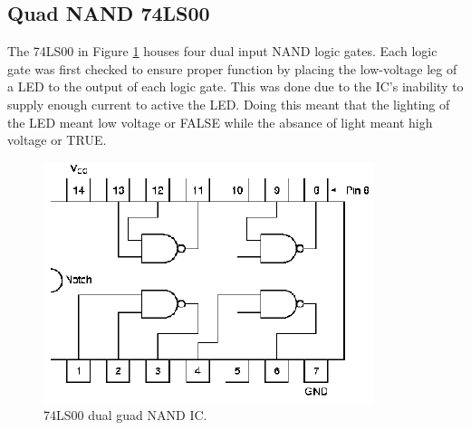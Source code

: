 \documentclass[11pt,onecolumn,letter]{article}
\begin{document}
\subsection{Quad NAND 74LS00}\label{subsec:QuadNAND}
The 74LS00 in Figure \ref{fig:74LS00} houses four dual input NAND logic gates. Each logic gate was first checked to ensure proper function by placing the low-voltage leg of a LED to the output of each logic gate. This was done due to the IC's inability to supply enough current to active the LED. Doing this meant that the lighting of the LED meant low voltage or FALSE while the absance of light meant high voltage or TRUE.
%
%
\begin{figure}
\center
\includegraphics{74LS00.eps}
\caption{74LS00 dual guad NAND IC.}\label{fig:74LS00}
\end{figure}
\end{document}
